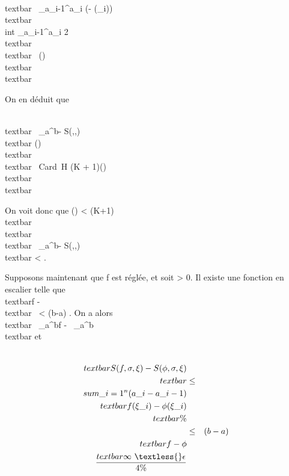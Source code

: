 \documentclass[]{article}
\begin{document}
\\textbar{}\int ~
\_a\_i-1^a\_i (\phi -
\phi(\xi\_i))\\textbar{} \leq\\int
 \_a\_i-1^a\_i
2\\textbar{}\phi\\textbar{}\infty~ \delta(\sigma)\\textbar{}\phi\\textbar{}\infty~

On en déduit que

\\textbar{}\int ~
\_a^b\phi - S(\phi,\sigma,\xi)\\textbar{} \delta(\sigma)\\textbar{}\phi\\textbar{}
\infty~Card~H (K +
1)\delta(\sigma)\\textbar{}\phi\\textbar{}\infty~

On voit donc que \delta(\sigma) \textless{} \epsilon {}(K+1)\\textbar{}\phi\\textbar{}\infty~
\rigtharrow~\\textbar{}\int ~
\_a^b\phi - S(\phi,\sigma,\xi)\\textbar{} \textless{} \epsilon.

Supposons maintenant que f est réglée, et soit \epsilon \textgreater{} 0. Il
existe une fonction \phi en escalier telle que \\textbar{}f
- \phi\\textbar{}\infty~ \textless{} \epsilon {}(b-a) . On a alors
\\textbar{}\int ~
\_a^bf -\int ~
\_a^b\phi\\textbar{} \leq \epsilon {} et

\begin{align*} \\textbar{}S(f,\sigma,\xi) -
S(\phi,\sigma,\xi)\\textbar{}& \leq& \\sum
\_i=1^n(a\_ i -
a\_i-1)\\textbar{}f(\xi\_i) -
\phi(\xi\_i)\\textbar{}\%&
\\ & \leq& (b -
a)\\textbar{}f - \phi\\textbar{}\infty~
\textless{} \epsilon \over 4 \%&
\\ \end{align*}
\end{document}
